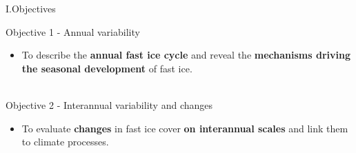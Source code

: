 \documentclass[8pt]{beamer}
\begin{document}
\setwatermark{\fontsize{125pt}{125pt}\selectfont{}}
\begin{frame}[fragile]{I.Objectives}
		
	Objective 1 -  Annual variability
		\begin{itemize}
			\item To describe the \textbf{annual fast ice cycle} and 
		reveal the \textbf{mechanisms driving the seasonal development} of fast ice.\\~\\
		\end{itemize}
	Objective 2 - Interannual variability and changes
		\begin{itemize}
			\item To evaluate \textbf{changes} in fast ice cover \textbf{on interannual scales} and 
		link them to climate processes.
		\end{itemize}

\end{frame}
\end{document}
